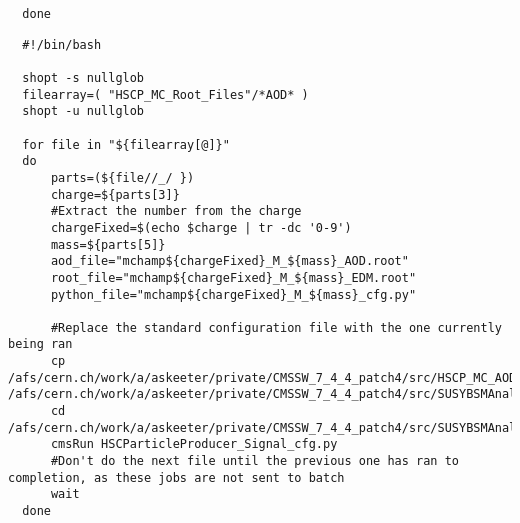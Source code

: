 \documentclass[11 pt , letterpaper , twoside , openright]{book}
\begin{document}
\begin{enumerate}
\begin{lstlisting}
  done
\end{lstlisting}

\lstset{language=sh,label=aod-to-edm-runner,caption= ,numbers=none}
\begin{lstlisting}
  #!/bin/bash

  shopt -s nullglob
  filearray=( "HSCP_MC_Root_Files"/*AOD* )
  shopt -u nullglob

  for file in "${filearray[@]}"
  do
      parts=(${file//_/ })
      charge=${parts[3]}
      #Extract the number from the charge
      chargeFixed=$(echo $charge | tr -dc '0-9')
      mass=${parts[5]}    
      aod_file="mchamp${chargeFixed}_M_${mass}_AOD.root"
      root_file="mchamp${chargeFixed}_M_${mass}_EDM.root"
      python_file="mchamp${chargeFixed}_M_${mass}_cfg.py"

      #Replace the standard configuration file with the one currently being ran
      cp /afs/cern.ch/work/a/askeeter/private/CMSSW_7_4_4_patch4/src/HSCP_MC_AODtoEDM_Python_Files/${python_file} /afs/cern.ch/work/a/askeeter/private/CMSSW_7_4_4_patch4/src/SUSYBSMAnalysis/HSCP/test/MakeEDMtuples/HSCParticleProducer_Signal_cfg.py
      cd /afs/cern.ch/work/a/askeeter/private/CMSSW_7_4_4_patch4/src/SUSYBSMAnalysis/HSCP/test/MakeEDMtuples/
      cmsRun HSCParticleProducer_Signal_cfg.py
      #Don't do the next file until the previous one has ran to completion, as these jobs are not sent to batch
      wait
  done
\end{lstlisting}
\end{enumerate}
\end{document}
